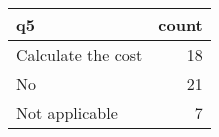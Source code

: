 \begin{tabular}{lr}
\toprule
                 q5 &  count \\
\midrule
 Calculate the cost &     18 \\
                 No &     21 \\
     Not applicable &      7 \\
\bottomrule
\end{tabular}
